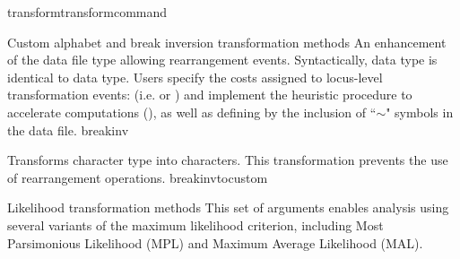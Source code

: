 \begin{command}{transform}{transformcommand}
\begin{arguments}
\begin{argumentgroup}{Custom alphabet and break inversion transformation methods}
{An enhancement \\ of the data file type  allowing
rearrangement events. Syntactically,  data type is identical to 
 data type. Users specify 
the costs assigned to locus-level transformation events: (i.e. 
 or ) 
and implement the heuristic procedure to accelerate computations 
(), as well as defining  by the 
inclusion of ``$\sim$" symbols in the data file.} 
{breakinv}

{Transforms  character type into  characters.
This transformation prevents the use of rearrangement operations.}
{breakinvtocustom}


\end{argumentgroup}


\begin{argumentgroup}{Likelihood transformation methods}
This set of arguments enables analysis using several variants of the
maximum likelihood criterion, including Most Parsimonious Likelihood (MPL)
and Maximum Average Likelihood (MAL). 


\end{argumentgroup}
\end{arguments}
\end{command}
